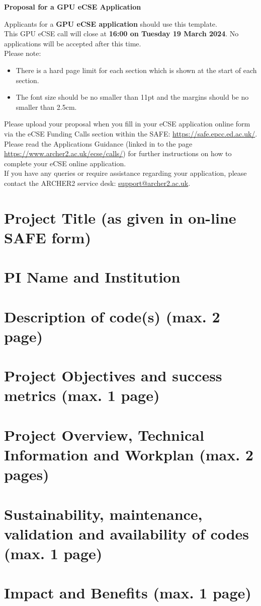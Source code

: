 \documentclass[a4paper,11pt]{article}
\title{}
\author{}
\date{\today}
\begin{document}
\begin{center}
\huge \textbf{Proposal for a GPU eCSE Application}\\
\end{center}
Applicants for a \textbf{GPU eCSE application} should use this template.\\

\noindent This GPU eCSE call will close at \textbf{16:00 on Tuesday 19 March 2024}. No applications will be accepted after this time.\\

\noindent Please note:
\begin{itemize}[nosep]
	\item There is a hard page limit for each section which is shown at the start of each section. 
	\item The font size should be no smaller than 11pt and the margins should be no smaller than 2.5cm. 
\end{itemize}\vspace{1em}

\noindent Please upload your proposal when you fill in your eCSE application online form via the eCSE Funding Calls section within the SAFE: \url{https://safe.epcc.ed.ac.uk/}.\\

\noindent Please read the Applications Guidance (linked in to the page \url{https://www.archer2.ac.uk/ecse/calls/}) for further instructions on how to complete your eCSE online application.\\

\noindent If you have any queries or require assistance regarding your application, please contact the ARCHER2 service desk: \url{support@archer2.ac.uk}.

\section{Project Title (as given in on-line SAFE form)}

\section{PI Name and Institution}

\clearpage
\section{Description of code(s) (max. 2 page)}

\clearpage
\section{Project Objectives and success metrics (max. 1 page)}

\clearpage
\section{Project Overview, Technical Information and Workplan (max. 2 pages)}

\clearpage
\section{Sustainability, maintenance, validation and {{availability}} of codes (max. 1 page)}

\clearpage
\section{Impact and Benefits (max. 1 page)}
\end{document}
